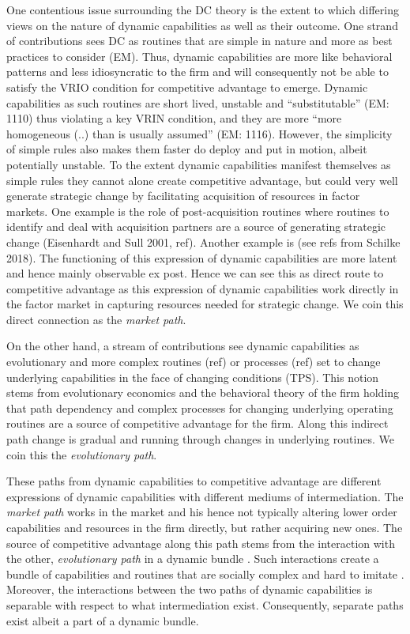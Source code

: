 \documentclass[review,fleqn]{elsarticle}\usepackage[]{graphicx}\usepackage[]{color}
\begin{document}
One contentious issue surrounding the DC theory is the extent to which differing views on
the nature of dynamic capabilities \citep{Peteraf2013} as well as their outcome. One
strand of contributions sees DC as routines that are simple in nature and more as best
practices to consider (EM). Thus, dynamic capabilities are more like behavioral patterns
and less idiosyncratic to the firm and will consequently not be able to satisfy the VRIO
condition for competitive advantage to emerge. Dynamic capabilities as such routines are
short lived, unstable and “substitutable” (EM: 1110) thus violating a key VRIN condition,
and they are more “more homogeneous (..) than is usually assumed” (EM: 1116). However, the
simplicity of simple rules also makes them faster do deploy and put in motion, albeit
potentially unstable. To the extent dynamic capabilities manifest themselves as simple
rules they cannot alone create competitive advantage, but could very well generate
strategic change by facilitating acquisition of resources in factor markets. One example
is the role of post-acquisition routines where routines to identify and deal with
acquisition partners are a source of generating strategic change (Eisenhardt and Sull
2001, ref). Another example is (see refs from Schilke 2018). The functioning of this
expression of dynamic capabilities are more latent and hence mainly observable ex
post. Hence we can see this as direct route to competitive advantage as this expression of
dynamic capabilities work directly in the factor market in capturing resources
needed for strategic change. We coin this direct connection as the \emph{market path}.

On the other hand, a stream of contributions see dynamic capabilities as evolutionary and
more complex routines (ref) or processes (ref) set to change underlying capabilities in
the face of changing conditions (TPS). This notion stems from evolutionary economics
\citep{Winter2003,Nelson1982} and the behavioral theory of the firm \citep{Cyert1963}
holding that path dependency and complex processes for changing underlying operating
routines are a source of competitive advantage for the firm. Along this indirect path
change is gradual and running through changes in underlying routines. We coin this the
\emph{evolutionary path}.

These paths from dynamic capabilities to competitive advantage are different expressions
of dynamic capabilities with different mediums of intermediation. The \emph{market path}
works in the market and his hence not typically altering lower order capabilities and
resources in the firm directly, but rather acquiring new ones. The source of competitive
advantage along this path stems from the interaction with the other, \emph{evolutionary
  path} in a dynamic bundle \citep{Peteraf2013}. Such interactions create a bundle of
capabilities and routines that are socially complex and hard to imitate
\citep[p. 320]{DiStefano2014}. Moreover, the interactions between the two paths of dynamic
capabilities is separable with respect to what intermediation exist. Consequently,
separate paths exist albeit a part of a dynamic bundle.
\end{document}
